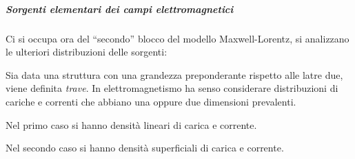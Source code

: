 \subparagraph{Sorgenti elementari dei campi elettromagnetici}
Ci si occupa ora del ``secondo'' blocco del modello Maxwell-Lorentz, si analizzano le ulteriori 
distribuzioni delle sorgenti:

Sia data una struttura con una grandezza preponderante rispetto alle latre due, viene definita 
\textit{trave}.
In elettromagnetismo ha senso considerare distribuzioni di cariche e correnti che abbiano una oppure
due dimensioni prevalenti.

Nel primo caso si hanno densità lineari di carica e corrente.

Nel secondo caso si hanno densità superficiali di carica e corrente.

